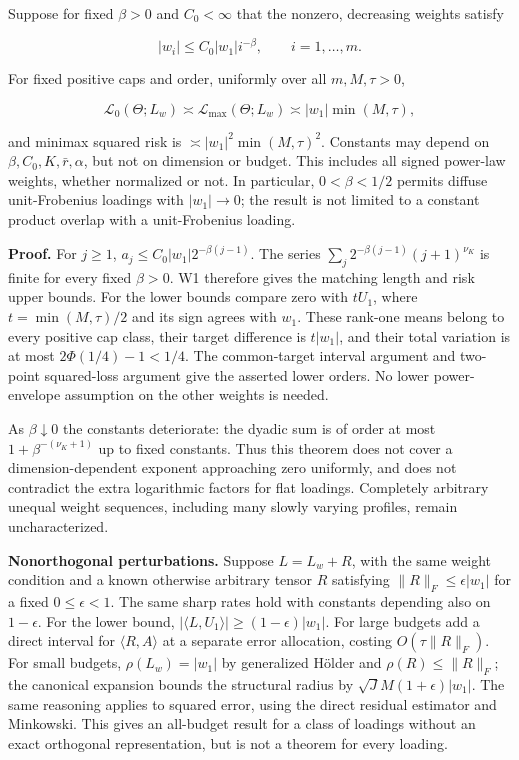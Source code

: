 \documentclass[
  10pt,
]{article}
\begin{document}
Suppose for fixed \(\beta>0\) and \(C_0<\infty\) that the nonzero,
decreasing weights satisfy

\[|w_i|\le C_0|w_1|i^{-\beta},\qquad i=1,\ldots,m.\]

For fixed positive caps and order, uniformly over all \(m,M,\tau>0\),

\[\mathcal L_0(\Theta;L_w)\asymp\mathcal L_{\max}(\Theta;L_w)
\asymp |w_1|\min(M,\tau),\]

and minimax squared risk is \(\asymp |w_1|^2\min(M,\tau)^2\). Constants
may depend on \(\beta,C_0,K,\bar r,\alpha\), but not on dimension or
budget. This includes all signed power-law weights, whether normalized
or not. In particular, \(0<\beta<1/2\) permits diffuse unit-Frobenius
loadings with \(|w_1|\to0\); the result is not limited to a constant
product overlap with a unit-Frobenius loading.

\textbf{Proof.} For \(j\ge1\), \(a_j\le C_0|w_1|2^{-\beta(j-1)}\). The
series \(\sum_j2^{-\beta(j-1)}(j+1)^{\nu_K}\) is finite for every fixed
\(\beta>0\). W1 therefore gives the matching length and risk upper
bounds. For the lower bounds compare zero with \(tU_1\), where
\(t=\min(M,\tau)/2\) and its sign agrees with \(w_1\). These rank-one
means belong to every positive cap class, their target difference is
\(t|w_1|\), and their total variation is at most \(2\Phi(1/4)-1<1/4\).
The common-target interval argument and two-point squared-loss argument
give the asserted lower orders. No lower power-envelope assumption on
the other weights is needed.

As \(\beta\downarrow0\) the constants deteriorate: the dyadic sum is of
order at most \(1+\beta^{-(\nu_K+1)}\) up to fixed constants. Thus this
theorem does not cover a dimension-dependent exponent approaching zero
uniformly, and does not contradict the extra logarithmic factors for
flat loadings. Completely arbitrary unequal weight sequences, including
many slowly varying profiles, remain uncharacterized.

\textbf{Nonorthogonal perturbations.} Suppose \(L=L_w+R\), with the same
weight condition and a known otherwise arbitrary tensor \(R\) satisfying
\(\|R\|_F\le\epsilon|w_1|\) for a fixed \(0\le\epsilon<1\). The same
sharp rates hold with constants depending also on \(1-\epsilon\). For
the lower bound, \(|\langle L,U_1\rangle|\ge(1-\epsilon)|w_1|\). For
large budgets add a direct interval for \(\langle R,A\rangle\) at a
separate error allocation, costing \(O(\tau\|R\|_F)\). For small
budgets, \(\rho(L_w)=|w_1|\) by generalized Hölder and
\(\rho(R)\le\|R\|_F\); the canonical expansion bounds the structural
radius by \(\sqrt J M(1+\epsilon)|w_1|\). The same reasoning applies to
squared error, using the direct residual estimator and Minkowski. This
gives an all-budget result for a class of loadings without an exact
orthogonal representation, but is not a theorem for every loading.
\end{document}
